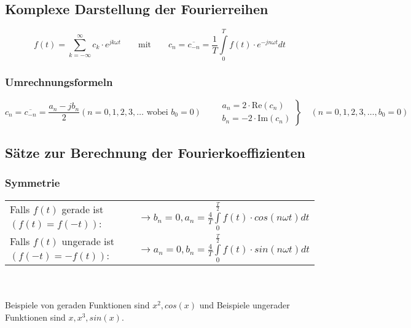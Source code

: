 \subsection{Komplexe Darstellung der Fourierreihen}

$$f(t) = \sum\limits_{k = -\infty}^{\infty} c_k \cdot e^{j k \omega t} \qquad \text{mit} \qquad c_n=\overline{c_{-n}}=\frac{1}{T}\int\limits_0^T{f(t)\cdot e^{-jn\omega t}dt}$$



\subsubsection{Umrechnungsformeln}
	$$c_n=\overline{c_{-n}}=\frac{a_n-jb_n}{2} (n=0,1,2,3,\ldots\text{ wobei }b_0=0)\qquad
      \left.
      \begin{array}{l} 
        a_n=2 \cdot \text{Re}(c_n)\\
        b_n=-2 \cdot \text{Im}(c_n)
      \end{array}
        \right\} 
        \quad
      (n=0,1,2,3,\ldots, b_0 = 0)$$
\subsection{Sätze zur Berechnung der Fourierkoeffizienten}
\subsubsection{Symmetrie}
\begin{tabular}{ll}
  Falls $f(t)$ gerade ist $(f(t) = f(-t))$: &\ $\rightarrow b_{n} = 0, a_{n} = \frac{4}{T}\int\limits_{0}^{\frac{T}{2}} f(t) \cdot cos(n \omega t)dt$\\
  Falls $f(t)$ ungerade ist $(f(-t) = -f(t))$: &\ $\rightarrow a_{n} = 0, b_{n} = \frac{4}{T}\int\limits_{0}^{\frac{T}{2}} f(t) \cdot sin(n \omega t)dt$\\
\end{tabular}\\\\
Beispiele von geraden Funktionen sind $x^2, cos(x)$ und Beispiele ungerader Funktionen sind $x, x^3, sin(x)$.
